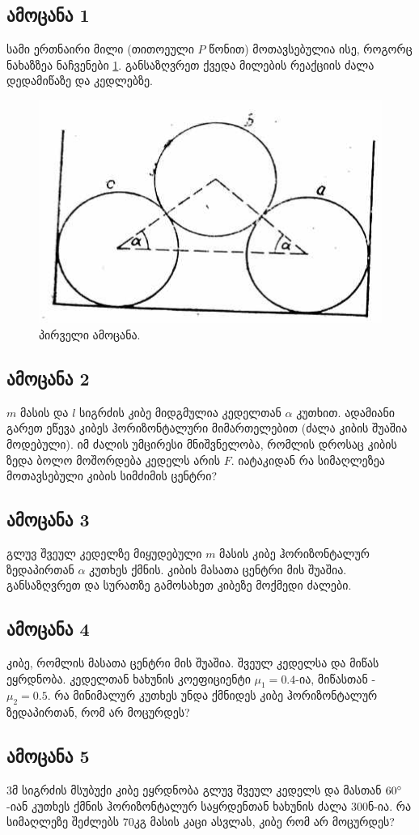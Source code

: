 \documentclass{article}
\begin{document}
\subsection{ამოცანა 1}
სამი ერთნაირი მილი (თითოეული $P$ წონით) მოთავსებულია ისე, როგორც ნახაზზეა ნაჩვენები \ref{fig:01}. განსაზღვრეთ ქვედა მილების რეაქციის ძალა დედამიწაზე და კედლებზე.
	\begin{figure}[H]
		\centering
		\includegraphics[width=0.2\columnwidth]{figures/01}
		\caption{პირველი ამოცანა.}
		\label{fig:01}
		\end{figure}
		
\subsection{ამოცანა 2}
$m$ მასის და $l$ სიგრძის კიბე მიდგმულია კედელთან $\alpha$ კუთხით. ადამიანი გარეთ ეწევა კიბეს ჰორიზონტალური მიმართელებით (ძალა კიბის შუაშია მოდებული). იმ ძალის უმცირესი მნიშვნელობა, რომლის დროსაც კიბის ზედა ბოლო მოშორდება კედელს არის $F$. იატაკიდან რა სიმაღლეზეა მოთავსებული კიბის სიმძიმის ცენტრი?

\subsection{ამოცანა 3}
გლუვ შვეულ კედელზე მიყუდებული $m$ მასის კიბე ჰორიზონტალურ ზედაპირთან $\alpha$ კუთხეს ქმნის. კიბის მასათა ცენტრი მის შუაშია. განსაზღვრეთ და სურათზე გამოსახეთ კიბეზე მოქმედი ძალები.

\subsection{ამოცანა 4}
კიბე, რომლის მასათა ცენტრი მის შუაშია. შვეულ კედელსა და მიწას ეყრდნობა. კედელთან ხახუნის კოეფიციენტი $\mu_1 = 0.4$-ია, მიწასთან - $\mu_2 = 0.5$. რა მინიმალურ კუთხეს უნდა ქმნიდეს კიბე ჰორიზონტალურ ზედაპირთან, რომ არ მოცურდეს?


\subsection{ამოცანა 5}
3მ სიგრძის მსუბუქი კიბე ეყრდნობა გლუვ შვეულ კედელს და მასთან $60 \degree$-იან კუთხეს ქმნის ჰორიზონტალურ საყრდენთან ხახუნის ძალა 300ნ-ია. რა სიმაღლეზე შეძლებს 70კგ მასის კაცი ასვლას, კიბე რომ არ მოცურდეს?
\end{document}
